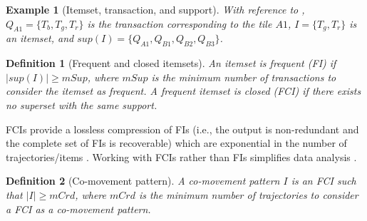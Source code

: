 \documentclass[preprint,12pt,authoryear]{elsarticle} %
\newtheorem{example}{Example}
\newtheorem{definition}{Definition}
\begin{document}
\begin{example}[Itemset, transaction, and support]
With reference to , $Q_{A1}=\{T_b,T_g,T_r\}$ is the transaction corresponding to the tile $A1$, $I=\{T_g,T_r\}$ is an itemset, and $sup(I) = \{Q_{A1}, Q_{B1}, Q_{B2}, Q_{B3}\}$.
\end{example}

\begin{definition}[Frequent and closed itemsets]\label{def:fci}
An itemset is \textit{frequent} (FI) if $|sup(I)|\geq mSup$, where $mSup$ is the minimum number of transactions to consider the itemset as frequent.
A frequent itemset is \textit{closed} (FCI) if there exists no superset with the same support. 
\end{definition}

FCIs provide a lossless compression of FIs \citep{DBLP:conf/dmkd/PeiHM00} (i.e., the output is non-redundant and the complete set of FIs is recoverable) which are exponential in the number of trajectories/items \citep{DBLP:conf/vldb/AgrawalS94}. 
Working with FCIs rather than FIs simplifies data analysis \citep{DBLP:journals/isci/FranciaGR20}.

\begin{definition}[Co-movement pattern]\label{def:comov}
A \textit{co-movement pattern} $I$ is an FCI such that $|I| \ge mCrd$, where $mCrd$ is the minimum number of trajectories to consider a FCI as a co-movement pattern.
\end{definition}
\end{document}
